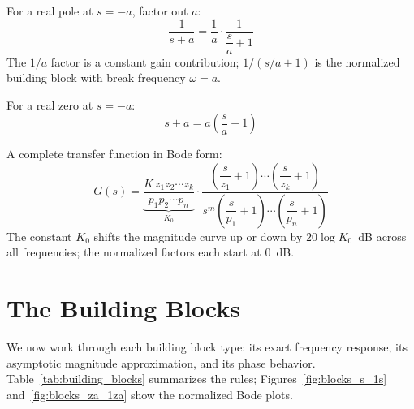 \documentclass[../../book.tex]{subfiles}
\begin{document}
For a real pole at $s = -a$, factor out $a$:
\begin{equation}
  \frac{1}{s + a} = \frac{1}{a} \cdot \frac{1}{\dfrac{s}{a} + 1}
  \label{eq:bode_form_pole}
\end{equation}
The $1/a$ factor is a constant gain contribution; $1/(s/a + 1)$ is the
normalized building block with break frequency $\omega = a$.

For a real zero at $s = -a$:
\begin{equation}
  s + a = a\!\left(\frac{s}{a} + 1\right)
  \label{eq:bode_form_zero}
\end{equation}

A complete transfer function in Bode form:
\begin{equation}
  G(s) = \underbrace{\frac{K\,z_1 z_2\cdots z_k}{p_1 p_2\cdots p_n}}_{\displaystyle K_0}
  \cdot
  \frac{\left(\dfrac{s}{z_1}+1\right)\cdots\left(\dfrac{s}{z_k}+1\right)}
       {s^m\!\left(\dfrac{s}{p_1}+1\right)\cdots\left(\dfrac{s}{p_n}+1\right)}
  \label{eq:bode_form_general}
\end{equation}
The constant $K_0$ shifts the magnitude curve up or down by $20\log K_0$~dB
across all frequencies; the normalized factors each start at 0~dB.

\section{The Building Blocks}
\label{sec:blocks}

We now work through each building block type: its exact frequency response,
its asymptotic magnitude approximation, and its phase behavior.
Table~\ref{tab:building_blocks} summarizes the rules; Figures~\ref{fig:blocks_s_1s}
and~\ref{fig:blocks_za_1za} show the normalized Bode plots.
\end{document}
